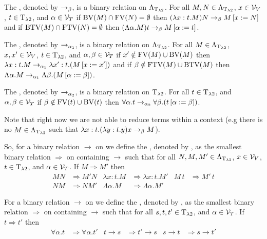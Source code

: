 \begin{definition}\label{def.2.6}
The , denoted by $\rightarrow_\beta$, is a binary relation on $\Lambda_{\text{T}_{\lambda2}}$. For all $M,N\in\Lambda_{\text{T}_{\lambda2}}$, $x\in\mathcal{V}_V$, $t\in\text{T}_{\lambda2}$, and $\alpha\in\mathcal{V}_T$ if $\text{BV}(M)\cap\text{FV}(N)=\emptyset$ then $(\lambda x:t.M)N\rightarrow_\beta M\left[x:=N\right]$ and if $\text{BTV}(M)\cap\text{FTV}(N)=\emptyset$ then $(\Lambda\alpha.M)t\rightarrow_\beta M\left[\alpha:=t\right]$.

The , denoted by $\rightarrow_{\alpha_1}$, is a binary relation on $\Lambda_{\text{T}_{\lambda2}}$. For all $M\in\Lambda_{\text{T}_{\lambda2}}$, $x,x'\in\mathcal{V}_V$, $t\in\text{T}_{\lambda2}$, and $\alpha,\beta\in\mathcal{V}_T$ if $x'\notin\text{FV}(M)\cup\text{BV}(M)$ then $\lambda x:t.M\rightarrow_{\alpha_1}\lambda x':t.(M\left[x:=x'\right])$ and if $\beta\notin\text{FTV}(M)\cup\text{BTV}(M)$ then $\Lambda \alpha.M\rightarrow_{\alpha_1}\Lambda \beta.(M\left[\alpha:=\beta\right])$.

The , denoted by $\rightarrow_{\alpha_2}$, is a binary relation on $\text{T}_{\lambda2}$. For all $t\in\text{T}_{\lambda2}$, and $\alpha,\beta\in\mathcal{V}_T$ if $\beta\notin\text{FV}(t)\cup\text{BV}(t)$ then $\forall\alpha.t\rightarrow_{\alpha_2}\forall\beta.(t\left[\alpha:=\beta\right])$.
\end{definition}

Note that right now we are not able to reduce terms within a context (e.g there is no $M\in\Lambda_{\text{T}_{\lambda2}}$ such that $\lambda x:t.(\lambda y:t.y)x\rightarrow_\beta M$).

\begin{definition}\label{def.2.7}
So, for a binary relation $\rightarrow$ on \lambdaTerms{} we define the , denoted by \lambdaTermContext{\rightarrow}, as the smallest binary relation $\Rightarrow$ on \lambdaTerms{} containing $\rightarrow$ such that for all $N,M,M'\in\Lambda_{\text{T}_{\lambda2}}$, $x\in\mathcal{V}_V$, $t\in\text{T}_{\lambda2}$, and $\alpha\in\mathcal{V}_T$. If $M\Rightarrow M'$ then
\begin{align*}
MN&\Rightarrow M'N      & \lambda x:t.M&\Rightarrow\lambda x:t.M' & M\,t&\Rightarrow M'\,t \\
NM&\Rightarrow NM'   & \Lambda\alpha.M&\Rightarrow \Lambda\alpha.M'   
\end{align*}

For a binary relation $\rightarrow$ on \lambdaTypes{} we define the , denoted by \lambdaTypeContext{\rightarrow}, as the smallest binary relation $\Rightarrow$ on \lambdaTypes{} containing $\rightarrow$ such that for all $s,t,t'\in\text{T}_{\lambda2}$, and $\alpha\in\mathcal{V}_T$. If $t\Rightarrow t'$ then
\begin{align*}
\forall\alpha.t&\Rightarrow\forall\alpha.t'        & t\to s&\Rightarrow t'\to s      & s\to t&\Rightarrow s\to t'
\end{align*}
\end{definition}

